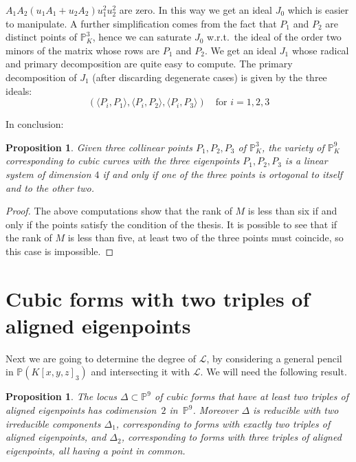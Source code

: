 \documentclass{amsart}
\theoremstyle{plain}
\newtheorem{prop}[theorem]{Proposition}
\theoremstyle{definition}
\newcommand{\p}{\mathbb{P}}
\newcommand{\sL}{\mathcal{L}}
\newcommand{\scl}[2]{\langle #1, #2 \rangle}
\begin{document}
$A_1A_2(u_1A_1+u_2A_2)u_1^2u_2^2$ are zero. In this way we get an ideal
$J_0$ which is easier to manipulate. A further simplification comes
from the fact that $P_1$ and $P_2$ are distinct points of $\mathbb{P}^3_K$,
hence we can saturate $J_0$ w.r.t.\ the ideal of the order two minors of
the matrix whose rows are $P_1$ and $P_2$. We get an ideal
$J_1$ whose radical and primary decomposition are quite easy to compute.
The primary decomposition of $J_1$ (after discarding 
degenerate cases) is given by the three ideals:
\begin{equation}\label{eq: fibre 4 dim}
\left(\scl{P_i}{P_1}, \scl{P_i}{P_2},\scl{P_i}{P_3}\right) \quad
\mbox{for $i = 1, 2, 3$}
\end{equation}



In conclusion:
\begin{prop}
  Given three collinear points $P_1, P_2, P_3$ of
  $\mathbb{P}^3_K$, the variety of $\mathbb{P}^9_K$ corresponding
  to cubic curves with the three eigenpoints $P_1, P_2, P_3$
  is a linear system of dimension $4$ if and only if 
  one of the three points is ortogonal to itself and to the other two.
\label{prototipo}
\end{prop}
\begin{proof}
  The above
  computations show that the rank of $M$ is less than six if and only
  if the points satisfy the condition of the thesis. It is possible
  to see that if the rank of $M$ is less than five, at least two of the
  three points must coincide, so this case is impossible.
\end{proof}





\section{Cubic forms with two triples of aligned eigenpoints} 
Next we are going to determine the degree of $\sL$, by considering a general pencil in $\p(K[x,y,z]_3)$
and intersecting it with $\sL$. We will need the following result.

\begin{prop}\label{pro: dimension of Delta}
    The locus $\Delta \subset \p^9$ of cubic forms that have at least two triples of aligned eigenpoints has codimension~$2$ in~$\p^9$. Moreover $\Delta$ is reducible with two irreducible components
    $\Delta_1$, corresponding to forms with exactly two triples of aligned eigenpoints, and $\Delta_2$, corresponding to forms with three triples of aligned eigenpoints, all having a point in common.
\end{prop}
\end{document}
